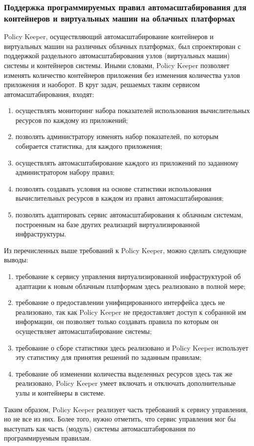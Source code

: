 \subsubsection*{Поддержка программируемых правил автомасштабирования для контейнеров и виртуальных машин на облачных платформах}
Policy Keeper\cite{supporting-programmable-autoscaling}, осуществляющий автомасштабирование контейнеров и виртуальных машин на различных облачных платформах, был спроектирован с поддержкой раздельного автомасштабирования узлов (виртуальных машин) системы и контейнеров системы.
Иными словами, Policy Keeper позволяет изменять количество контейнеров приложения без изменения количества узлов приложения и наоборот.
В круг задач, решаемых таким сервисом автомасштабирования, входят:
\begin{enumerate}
    \item осуществлять мониторинг набора показателей использования вычислительных ресурсов по каждому из приложений;
    \item позволять администратору изменять набор показателей, по которым собирается статистика, для каждого приложения;
    \item осуществлять автомасштабирование каждого из приложений по заданному администратором набору правил;
    \item позволять создавать условия на основе статистики использования вычислительных ресурсов в каждом из правил автомасштабирования;
    \item позволять адаптировать сервис автомасштабирования к облачным системам, построенным на базе других реализаций виртуализированной инфраструктуры.
\end{enumerate}

Из перечисленных выше требований к Policy Keeper, можно сделать следующие выводы:
\begin{enumerate}
    \item требование к сервису управления виртуализированной инфраструктурой об адаптации к новым облачным платформам здесь реализовано в полной мере;
    \item требование о предоставлении унифицированного интерфейса здесь не реализовано, так как Policy Keeper не предоставляет доступ к собранной им информации, он позволяет только создавать правила по которым он осуществляет автомасштабирование системы;
    \item требование о сборе статистики здесь реализовано и Policy Keeper использует эту статистику для принятия решений по заданным правилам;
    \item требование об изменении количества выделенных ресурсов здесь так же реализовано, Policy Keeper умеет включать и отключать дополнительные узлы и контейнеры в системе.
\end{enumerate}

Таким образом, Policy Keeper реализует часть требований к сервису управления, но не все из них. Более того, нужно отметить, что сервис управления мог бы выступать как часть (модуль) системы автомасштабирования по программируемым правилам.

